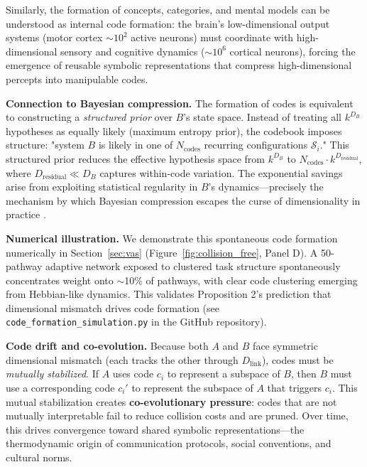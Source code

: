 \documentclass[12pt]{article}
\begin{document}
Similarly, the formation of concepts, categories, and mental models can be understood as internal code formation: the brain's low-dimensional output systems (motor cortex $\sim 10^2$ active neurons) must coordinate with high-dimensional sensory and cognitive dynamics ($\sim 10^6$ cortical neurons), forcing the emergence of reusable symbolic representations that compress high-dimensional percepts into manipulable codes.

\textbf{Connection to Bayesian compression.} The formation of codes is equivalent to constructing a \textit{structured prior} over $B$'s state space. Instead of treating all $k^{D_B}$ hypotheses as equally likely (maximum entropy prior), the codebook imposes structure: "system $B$ is likely in one of $N_{\text{codes}}$ recurring configurations $\mathcal{S}_i$." This structured prior reduces the effective hypothesis space from $k^{D_B}$ to $N_{\text{codes}} \cdot k^{D_{\text{residual}}}$, where $D_{\text{residual}} \ll D_B$ captures within-code variation. The exponential savings arise from exploiting statistical regularity in $B$'s dynamics---precisely the mechanism by which Bayesian compression escapes the curse of dimensionality in practice \cite{bengio2013}.

\textbf{Numerical illustration.} We demonstrate this spontaneous code formation numerically in Section~\ref{sec:vas} (Figure~\ref{fig:collision_free}, Panel D). A 50-pathway adaptive network exposed to clustered task structure spontaneously concentrates weight onto $\sim$10\% of pathways, with clear code clustering emerging from Hebbian-like dynamics. This validates Proposition 2's prediction that dimensional mismatch drives code formation (see \texttt{code\_formation\_simulation.py} in the GitHub repository).

\textbf{Code drift and co-evolution.} Because both $A$ and $B$ face symmetric dimensional mismatch (each tracks the other through $D_{\text{link}}$), codes must be \textit{mutually stabilized}. If $A$ uses code $c_i$ to represent a subspace of $B$, then $B$ must use a corresponding code $c_i'$ to represent the subspace of $A$ that triggers $c_i$. This mutual stabilization creates \textbf{co-evolutionary pressure}: codes that are not mutually interpretable fail to reduce collision costs and are pruned. Over time, this drives convergence toward shared symbolic representations---the thermodynamic origin of communication protocols, social conventions, and cultural norms.
\end{document}
